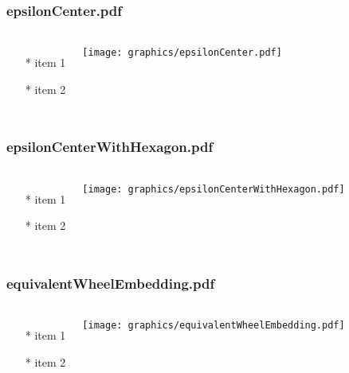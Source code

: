 \begin{frame} \frametitle{epsilonCenter.pdf}
    \begin{columns}[c]
        \begin{itemize}
            \item[*] item 1
            \item[*] item 2
        \end{itemize}
        \begin{minipage}{\linewidth}
            \begin{center}
            \texttt{[image: graphics/epsilonCenter.pdf]}
            \label{gfx:epsilonCenter.pdf}
            \end{center}
        \end{minipage}
    \end{columns}
\end{frame}
\begin{frame} \frametitle{epsilonCenterWithHexagon.pdf}
    \begin{columns}[c]
        \begin{itemize}
            \item[*] item 1
            \item[*] item 2
        \end{itemize}
        \begin{minipage}{\linewidth}
            \begin{center}
            \texttt{[image: graphics/epsilonCenterWithHexagon.pdf]}
            \label{gfx:epsilonCenterWithHexagon.pdf}
            \end{center}
        \end{minipage}
    \end{columns}
\end{frame}
\begin{frame} \frametitle{equivalentWheelEmbedding.pdf}
    \begin{columns}[c]
        \begin{itemize}
            \item[*] item 1
            \item[*] item 2
        \end{itemize}
        \begin{minipage}{\linewidth}
            \begin{center}
            \texttt{[image: graphics/equivalentWheelEmbedding.pdf]}
            \label{gfx:equivalentWheelEmbedding.pdf}
            \end{center}
        \end{minipage}
    \end{columns}
\end{frame}

